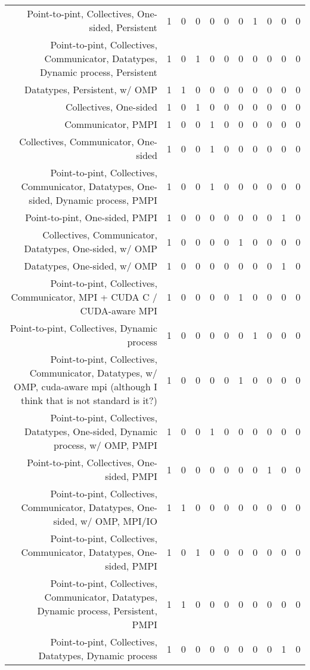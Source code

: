 {\begin{landscape}
\begin{longtable}[htb]{r|c|c|c|c|c|c|c|c|c|c}
{Point-to-pint, Collectives, One-sided, Persistent} & 1 & 0 & 0 & 0 & 0 & 0 & 1 & 0 & 0 & 0 \\%
{Point-to-pint, Collectives, Communicator, Datatypes, Dynamic process, Persistent} & 1 & 0 & 1 & 0 & 0 & 0 & 0 & 0 & 0 & 0 \\%
{Datatypes, Persistent, w/ OMP} & 1 & 1 & 0 & 0 & 0 & 0 & 0 & 0 & 0 & 0 \\%
{Collectives, One-sided} & 1 & 0 & 1 & 0 & 0 & 0 & 0 & 0 & 0 & 0 \\%
{Communicator, PMPI} & 1 & 0 & 0 & 1 & 0 & 0 & 0 & 0 & 0 & 0 \\%
{Collectives, Communicator, One-sided} & 1 & 0 & 0 & 1 & 0 & 0 & 0 & 0 & 0 & 0 \\%
{Point-to-pint, Collectives, Communicator, Datatypes, One-sided, Dynamic process, PMPI} & 1 & 0 & 0 & 1 & 0 & 0 & 0 & 0 & 0 & 0 \\%
{Point-to-pint, One-sided, PMPI} & 1 & 0 & 0 & 0 & 0 & 0 & 0 & 0 & 1 & 0 \\%
{Collectives, Communicator, Datatypes, One-sided, w/ OMP} & 1 & 0 & 0 & 0 & 0 & 1 & 0 & 0 & 0 & 0 \\%
{Datatypes, One-sided, w/ OMP} & 1 & 0 & 0 & 0 & 0 & 0 & 0 & 0 & 1 & 0 \\%
{Point-to-pint, Collectives, Communicator, MPI + CUDA C / CUDA-aware MPI} & 1 & 0 & 0 & 0 & 0 & 1 & 0 & 0 & 0 & 0 \\%
{Point-to-pint, Collectives, Dynamic process} & 1 & 0 & 0 & 0 & 0 & 0 & 1 & 0 & 0 & 0 \\%
{Point-to-pint, Collectives, Communicator, Datatypes, w/ OMP, cuda-aware mpi (although I think that is not standard is it?)} & 1 & 0 & 0 & 0 & 0 & 1 & 0 & 0 & 0 & 0 \\%
{Point-to-pint, Collectives, Datatypes, One-sided, Dynamic process, w/ OMP, PMPI} & 1 & 0 & 0 & 1 & 0 & 0 & 0 & 0 & 0 & 0 \\%
{Point-to-pint, Collectives, One-sided, PMPI} & 1 & 0 & 0 & 0 & 0 & 0 & 0 & 1 & 0 & 0 \\%
{Point-to-pint, Collectives, Communicator, Datatypes, One-sided, w/ OMP, MPI/IO} & 1 & 1 & 0 & 0 & 0 & 0 & 0 & 0 & 0 & 0 \\%
{Point-to-pint, Collectives, Communicator, Datatypes, One-sided, PMPI} & 1 & 0 & 1 & 0 & 0 & 0 & 0 & 0 & 0 & 0 \\%
{Point-to-pint, Collectives, Communicator, Datatypes, Dynamic process, Persistent, PMPI} & 1 & 1 & 0 & 0 & 0 & 0 & 0 & 0 & 0 & 0 \\%
{Point-to-pint, Collectives, Datatypes, Dynamic process} & 1 & 0 & 0 & 0 & 0 & 0 & 0 & 0 & 1 & 0 \\%

\end{longtable}
\end{landscape}}
